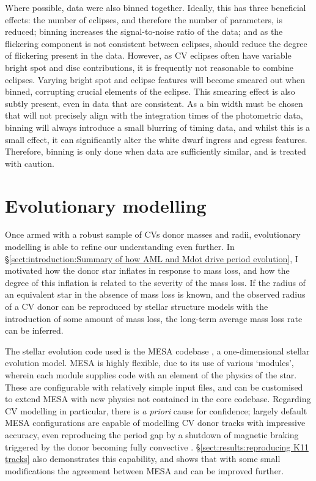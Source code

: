 Where possible, data were also binned together. Ideally, this has three beneficial effects: the number of eclipses, and therefore the number of parameters, is reduced; binning increases the signal-to-noise ratio of the data; and as the flickering component is not consistent between eclipses, should reduce the degree of flickering present in the data. However, as CV eclipses often have variable bright spot and disc contributions, it is frequently not reasonable to combine eclipses. Varying bright spot and eclipse features will become smeared out when binned, corrupting crucial elements of the eclipse.
This smearing effect is also subtly present, even in data that are consistent. As a bin width must be chosen that will not precisely align with the integration times of the photometric data, binning will always introduce a small blurring of timing data, and whilst this is a small effect, it can significantly alter the white dwarf ingress and egress features.
Therefore, binning is only done when data are sufficiently similar, and is treated with caution.



\section{Evolutionary modelling}
\label{sect:modelling:evolutionary modelling}

Once armed with a robust sample of CVs donor masses and radii, evolutionary modelling is able to refine our understanding even further. In \S\ref{sect:introduction:Summary of how AML and Mdot drive period evolution}, I motivated how the donor star inflates in response to mass loss, and how the degree of this inflation is related to the severity of the mass loss.
If the radius of an equivalent star in the absence of mass loss is known, and the observed radius of a CV donor can be reproduced by stellar structure models with the introduction of some amount of mass loss, the long-term average mass loss rate can be inferred.

The stellar evolution code used is the MESA codebase \citep{paxton2011,paxton2013,Paxton_2015,paxton2019}, a one-dimensional stellar evolution model. MESA is highly flexible, due to its use of various `modules', wherein each module supplies code with an element of the physics of the star. These are configurable with relatively simple input files, and can be customised to extend MESA with new physics not contained in the core codebase.
Regarding CV modelling in particular, there is \textit{a priori} cause for confidence; largely default MESA configurations are capable of modelling CV donor tracks with impressive accuracy, even reproducing the period gap by a shutdown of magnetic braking triggered by the donor becoming fully convective \citep{Paxton_2015}.
\S\ref{sect:results:reproducing K11 tracks} also demonstrates this capability, and shows that with some small modifications the agreement between MESA and \citet{knigge11} can be improved further.

